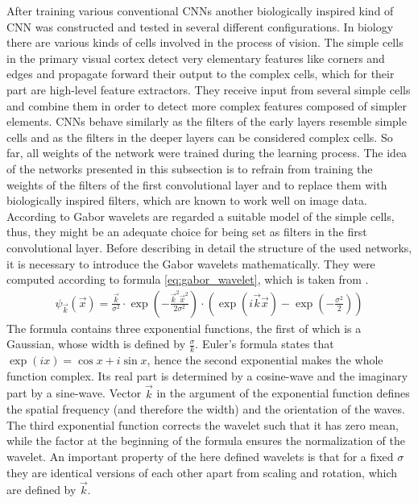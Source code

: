 \documentclass[11pt, a4paper]{article}
\begin{document}
After training various conventional \acp{CNN} another biologically inspired kind of \ac{CNN} was constructed and tested in several different configurations. In biology there are various kinds of cells involved in the process of vision. The simple cells in the primary visual cortex detect very elementary features like corners and edges and propagate forward their output to the complex cells, which for their part are high-level feature extractors. They receive input from several simple cells and combine them in order to detect more complex features composed of simpler elements. \acp{CNN} behave similarly as the filters of the early layers resemble simple cells and as the filters in the deeper layers can be considered complex cells. So far, all weights of the network were trained during the learning process. The idea of the networks presented in this subsection is to refrain from training the weights of the filters of the first convolutional layer and to replace them with biologically inspired filters, which are known to work well on image data. According to \cite{ebgm} Gabor wavelets are regarded a suitable model of the simple cells, thus, they might be an adequate choice for being set as filters in the first convolutional layer. Before describing in detail the structure of the used networks, it is necessary to introduce the Gabor wavelets mathematically. They were computed according to formula \eqref{eq:gabor_wavelet}, which is taken from \cite{ebgm}.
\begin{align}
\label{eq:gabor_wavelet}
\psi_{\vec{k}}(\vec{x}) = \frac{\vec{k}}{\sigma^2} \cdot \exp\left(-\frac{\vec{k}^2\vec{x}^2}{2\sigma^2}\right) \cdot \left(\exp\left(i\vec{k}\vec{x}\right) - \exp\left(-\frac{\sigma^2}{2}\right)\right)
\end{align}
The formula contains three exponential functions, the first of which is a Gaussian, whose width is defined by $\frac{\sigma}{k}$. Euler's formula states that $\exp(ix) = \cos x + i \sin x$, hence the second exponential makes the whole function complex. Its real part is determined by a cosine-wave and the imaginary part by a sine-wave. Vector $\vec{k}$ in the argument of the exponential function defines the spatial frequency (and therefore the width) and the orientation of the waves. The third exponential function corrects the wavelet such that it has zero mean, while the factor at the beginning of the formula ensures the normalization of the wavelet. An important property of the here defined wavelets is that for a fixed $\sigma$ they are identical versions of each other apart from scaling and rotation, which are defined by $\vec{k}$.\\
\end{document}
